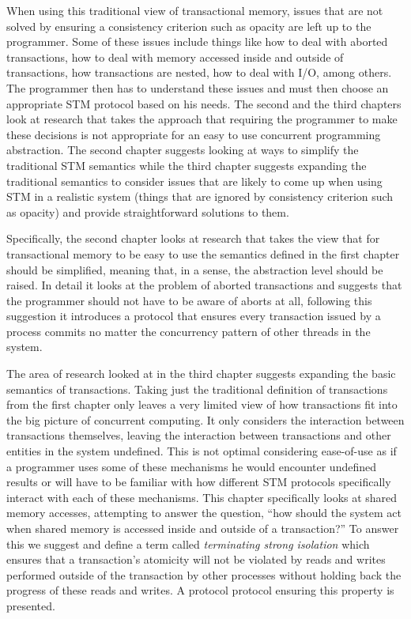 When using this traditional view of transactional memory,
issues that are not solved by ensuring a consistency criterion such as opacity are left up to the programmer.
Some of these issues include things like how to deal with aborted transactions, how to deal
with memory accessed inside and outside of transactions, how transactions are nested,
how to deal with I/O, among others.
The programmer then has to understand these issues and must then choose an
appropriate STM protocol based on his needs.
The second and the third chapters look at research that takes the approach
that requiring the programmer to make these decisions
is not appropriate for an easy to use concurrent programming abstraction.
The second chapter suggests looking at ways to simplify the traditional STM
semantics while the third chapter suggests expanding the traditional semantics to consider
issues that are likely to come up when using STM in a realistic system
(things that are ignored by consistency criterion such as opacity)
and provide straightforward solutions to them.


Specifically, the second chapter looks at research that takes the view that for transactional memory to
be easy to use the semantics defined in the first chapter should be simplified, meaning that,
in a sense, the abstraction level should be raised.
In detail it looks at the problem of aborted transactions and suggests that
the programmer should not have to be aware of aborts at all, following this suggestion it introduces a protocol
that ensures every transaction issued by a process commits no matter the concurrency pattern
of other threads in the system.

The area of research looked at in the third chapter suggests expanding the basic semantics of transactions.
Taking just the traditional definition of transactions from the first chapter only leaves a very limited view of how
transactions fit into the big picture of concurrent computing.
It only considers the interaction between transactions themselves,
leaving the interaction between
transactions and other entities in the system undefined.
This is not optimal considering ease-of-use as if a programmer uses
some of these mechanisms he would encounter undefined results or will have
to be familiar with how different STM protocols specifically interact with 
each of these mechanisms.
This chapter specifically looks at shared memory accesses, attempting to answer the question, ``how should the system act when shared memory
is accessed inside and outside of a transaction?''
To answer this we suggest and define a term called \emph{terminating strong isolation} which ensures
that a transaction's atomicity will not be violated by reads and writes performed
outside of the transaction by other processes without holding back the progress of
these reads and writes.
A protocol protocol ensuring this property is presented.

